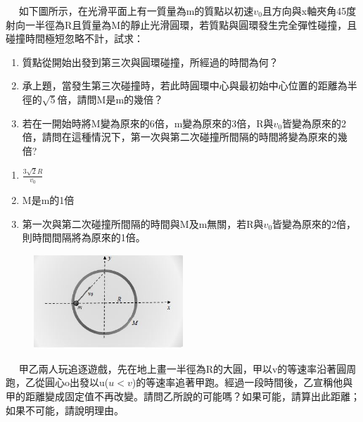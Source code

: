 \documentclass[cn,10pt,math=newtx,chinesefont=founder]{elegantbook}
\begin{document}
\newpage


\begin{example}　
    如下圖所示，在光滑平面上有一質量為m的質點以初速$v_0$且方向與x軸夾角45度射向一半徑為R且質量為M的靜止光滑圓環，若質點與圓環發生完全彈性碰撞，且碰撞時間極短忽略不計，試求：
    \begin{enumerate}[label=(\arabic*)]
    \item 質點從開始出發到第三次與圓環碰撞，所經過的時間為何？
    \item 承上題，當發生第三次碰撞時，若此時圓環中心與最初始中心位置的距離為半徑的$\sqrt{5}$倍，請問M是m的幾倍？
    \item 若在一開始時將M變為原來的6倍，m變為原來的3倍，R與$v_0$皆變為原來的2倍，請問在這種情況下，第一次與第二次碰撞所間隔的時間將變為原來的幾倍?
    \end{enumerate}
    
    \rightline{[2]}
\end{example}

\begin{solution}
\begin{enumerate}[label=(\arabic*)]
\item $\frac{3\sqrt{2}R}{v_0}$
\item M是m的1倍
\item 第一次與第二次碰撞所間隔的時間與M及m無關，若R與$v_0$皆變為原來的2倍，則時間間隔將為原來的1倍。
\end{enumerate}
\end{solution}

\begin{figure}[htbp]
\flushright
\includegraphics[width=0.5\textwidth]{image/2222.JPG}
\end{figure}

\newpage


\begin{example}　
    甲乙兩人玩追逐遊戲，先在地上畫一半徑為R的大圓，甲以v的等速率沿著圓周跑，乙從圓心o出發以u($u<v$)的等速率追著甲跑。經過一段時間後，乙宣稱他與甲的距離變成固定值不再改變。請問乙所說的可能嗎？如果可能，請算出此距離；如果不可能，請說明理由。
    
    \rightline{[3]}
\end{example}
\end{document}
